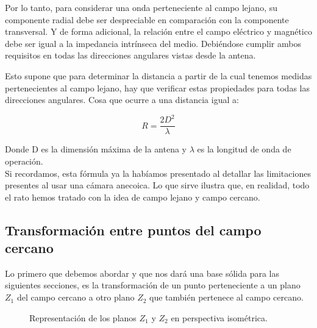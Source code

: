 \documentclass{article}
\begin{document}
Por lo tanto, para considerar una onda perteneciente al campo lejano, su componente radial debe ser despreciable en comparación con la componente transversal. Y de forma adicional, la relación entre el campo eléctrico y magnético debe ser igual a la impedancia intrínseca del medio. Debiéndose cumplir ambos requisitos en todas las direcciones angulares vistas desde la antena.\\
\newpage

Esto supone que para determinar la distancia a partir de la cual tenemos medidas pertenecientes al campo lejano, hay que verificar estas propiedades para todas las direcciones angulares. Cosa que ocurre a una distancia igual a:

\begin{equation}
                            R =\frac{2D^2}{\lambda}
\end{equation}

Donde D es la dimensión máxima de la antena y $\lambda$ es la longitud de onda de operación.\\

Si recordamos, esta fórmula ya la habíamos presentado al detallar las limitaciones presentes al usar una cámara anecoica. Lo que sirve ilustra que, en realidad, todo el rato hemos tratado con la idea de campo lejano y campo cercano.
\newpage

\subsection{Transformación entre puntos del campo cercano}

Lo primero que debemos abordar y que nos dará una base sólida para las siguientes secciones, es la transformación de un punto perteneciente a un plano $Z_1$ del campo cercano a otro plano $Z_2$ que también pertenece al campo cercano.

\begin{figure}[htbp]
  \centering
  \caption{Representación de los planos \( Z_1 \) y \( Z_2 \) en perspectiva isométrica.}
  \label{fig:planos_NF_Z1_Z2}
\end{figure}
\end{document}
